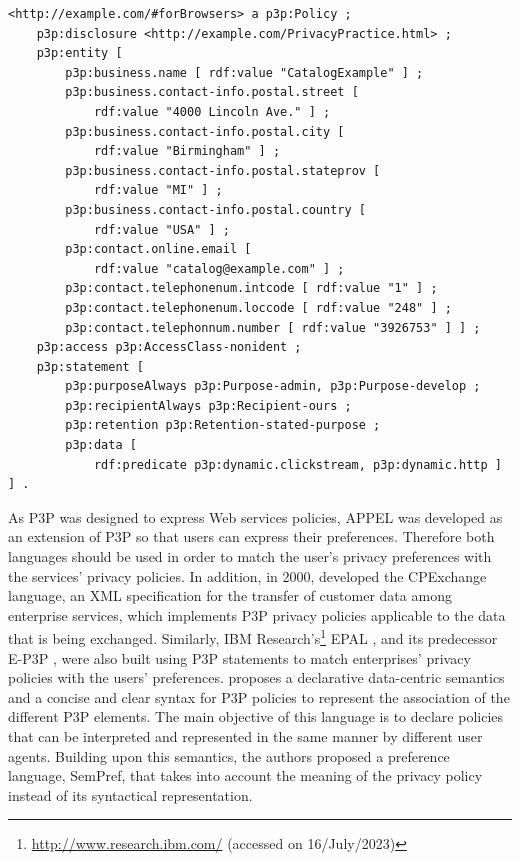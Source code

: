 \begin{listing}
\caption{P3P policy adapted from Example 3.1 of the P3P specification \citep{cranor_platform_2002}, which specifies the privacy policy of CatalogExample for Browsers.}
\label{list:p3p_example}
\begin{verbatim}
<http://example.com/#forBrowsers> a p3p:Policy ;
    p3p:disclosure <http://example.com/PrivacyPractice.html> ;
    p3p:entity [
        p3p:business.name [ rdf:value "CatalogExample" ] ;
        p3p:business.contact-info.postal.street [
            rdf:value "4000 Lincoln Ave." ] ;
        p3p:business.contact-info.postal.city [ 
            rdf:value "Birmingham" ] ;
        p3p:business.contact-info.postal.stateprov [ 
            rdf:value "MI" ] ;
        p3p:business.contact-info.postal.country [ 
            rdf:value "USA" ] ;
        p3p:contact.online.email [ 
            rdf:value "catalog@example.com" ] ;
        p3p:contact.telephonenum.intcode [ rdf:value "1" ] ;
        p3p:contact.telephonenum.loccode [ rdf:value "248" ] ;
        p3p:contact.telephonnum.number [ rdf:value "3926753" ] ] ;
    p3p:access p3p:AccessClass-nonident ;
    p3p:statement [
        p3p:purposeAlways p3p:Purpose-admin, p3p:Purpose-develop ;
        p3p:recipientAlways p3p:Recipient-ours ;
        p3p:retention p3p:Retention-stated-purpose ;
        p3p:data [
            rdf:predicate p3p:dynamic.clickstream, p3p:dynamic.http ] ] .
\end{verbatim}
\end{listing}

As P3P was designed to express Web services policies, APPEL \citep{cranor_p3p_2002} was developed as an extension of P3P so that users can express their preferences.
Therefore both languages should be used in order to match the user's privacy preferences with the services' privacy policies.
In addition, in 2000, \cite{bohrer_customer_2000} developed the CPExchange language, an XML specification for the transfer of customer data among enterprise services, which implements P3P privacy policies applicable to the data that is being exchanged. Similarly, IBM Research's\footnote{\url{http://www.research.ibm.com/} (accessed on 16/July/2023)} EPAL \citep{ashley_enterprise_2003}, and its predecessor E-P3P \citep{ashley_e-p3p_2002}, were also built using P3P statements to match enterprises' privacy policies with the users' preferences.
\cite{li_semantics-base_2006} proposes a declarative data-centric semantics and a concise and clear syntax for P3P policies to represent the association of the different P3P elements. The main objective of this language is to declare policies that can be interpreted and represented in the same manner by different user agents. Building upon this semantics, the authors proposed a preference language, SemPref, that takes into account the meaning of the privacy policy instead of its syntactical representation.

